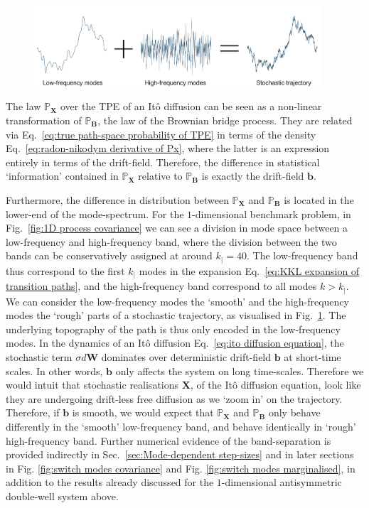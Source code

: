 \begin{figure}[t]
\includegraphics[width=0.95\textwidth]{figs_part1/mcmc/rough_path_decomposition}
\centering \caption{}
\label{fig:rough path decomposition} 
\end{figure}

The law $\mathbb{P}_\mathbf{X}$ over the TPE of an It\^{o} diffusion can be seen as a non-linear transformation of $\mathbb{P}_\mathbf{B}$, the law of the Brownian bridge process. They are related via Eq.~\ref{eq:true path-space probability of TPE} in terms of the density Eq.~\ref{eq:radon-nikodym derivative of Px}, where the latter is an expression entirely in terms of the drift-field. Therefore, the difference in statistical `information' contained in $\mathbb{P}_\mathbf{X}$ relative to $\mathbb{P}_\mathbf{B}$ is exactly the drift-field $\mathbf{b}$. 

Furthermore, the difference in distribution between $\mathbb{P}_\mathbf{X}$ and $\mathbb{P}_\mathbf{B}$ is located in the lower-end of the mode-spectrum. For the $1$-dimensional benchmark problem, in Fig.~\ref{fig:1D process covariance} we can see a division in mode space between a low-frequency and high-frequency band, where the division between the two bands can be conservatively assigned at around $k_| = 40$. The low-frequency band thus correspond to the first $k_|$ modes in the expansion Eq.~\ref{eq:KKL expansion of transition paths}, and the high-frequency band correspond to all modes $k > k_|$. We can consider the low-frequency modes the `smooth' and the high-frequency modes the `rough' parts of a stochastic trajectory, as visualised in Fig.~\ref{fig:rough path decomposition}. The underlying topography of the path is thus only encoded in the low-frequency modes. In the dynamics of an It\^{o} diffusion Eq.~\ref{eq:ito diffusion equation}, the stochastic term $\sigma d\mathbf{W}$ dominates over deterministic drift-field $\mathbf{b}$ at short-time scales. In other words, $\mathbf{b}$ only affects the system on long time-scales. Therefore we would intuit that stochastic realisations $\mathbf{X}$, of the It\^{o} diffusion equation, look like they are undergoing drift-less free diffusion as we `zoom in' on the trajectory. Therefore, if $\mathbf{b}$ is smooth, we would expect that $\mathbb{P}_\mathbf{X}$ and $\mathbb{P}_\mathbf{B}$ only behave differently in the `smooth' low-frequency band, and behave identically in `rough' high-frequency band. Further numerical evidence of the band-separation is provided indirectly in Sec.~\ref{sec:Mode-dependent step-sizes} and in later sections in Fig. \ref{fig:switch modes covariance} and Fig. \ref{fig:switch modes marginalised}, in addition to the results already discussed for the $1$-dimensional antisymmetric double-well system above.

